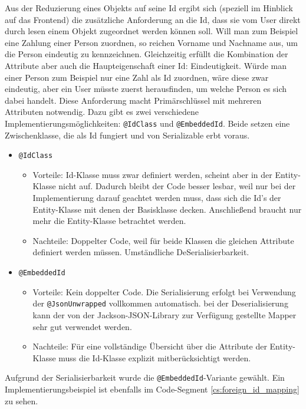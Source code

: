 
Aus der Reduzierung eines Objekts auf seine Id ergibt sich (speziell im Hinblick auf das Frontend) die zusätzliche Anforderung an die Id, dass sie vom User direkt durch lesen einem Objekt zugeordnet werden können soll. Will man zum Beispiel eine Zahlung einer Person zuordnen, so reichen Vorname und Nachname aus, um die Person eindeutig zu kennzeichnen. Gleichzeitig erfüllt die Kombination der Attribute aber auch die Haupteigenschaft einer Id: Eindeutigkeit. Würde man einer Person zum Beispiel nur eine Zahl als Id zuordnen, wäre diese zwar eindeutig, aber ein User müsste zuerst herausfinden, um welche Person es sich dabei handelt. Diese Anforderung macht Primärschlüssel mit mehreren Attributen notwendig. Dazu gibt es zwei verschiedene Implementierungsmöglichkeiten: \verb|@IdClass| und \verb|@EmbeddedId|. Beide setzen eine Zwischenklasse, die als Id fungiert und von Serializable erbt voraus. 

\begin{itemize}
	\item \verb|@IdClass|
	\begin{itemize}
		\item Vorteile: Id-Klasse muss zwar definiert werden, scheint aber in der Entity-Klasse nicht auf. Dadurch bleibt der Code besser lesbar, weil nur bei der Implementierung darauf geachtet werden muss, dass sich die Id's der Entity-Klasse mit denen der Basisklasse decken. Anschließend braucht nur mehr die Entity-Klasse betrachtet werden.
		\item Nachteile: Doppelter Code, weil für beide Klassen die gleichen Attribute definiert werden müssen. Umständliche DeSerialisierbarkeit.
	\end{itemize}	
	\item \verb|@EmbeddedId|
	\begin{itemize}
		\item Vorteile: Kein doppelter Code. Die Serialisierung erfolgt bei Verwendung der \verb|@JsonUnwrapped| vollkommen automatisch. bei der Deserialisierung kann der von der Jackson-JSON-Library zur Verfügung gestellte Mapper sehr gut verwendet werden. 
		\item Nachteile: Für eine vollständige Übersicht über die Attribute der Entity-Klasse muss die Id-Klasse explizit mitberücksichtigt werden.
	\end{itemize}
\end{itemize}

Aufgrund der Serialisierbarkeit wurde die \verb|@EmbeddedId|-Variante gewählt. Ein Implementierungsbeispiel ist ebenfalls im Code-Segment \ref{cs:foreign_id_mapping} zu sehen.

